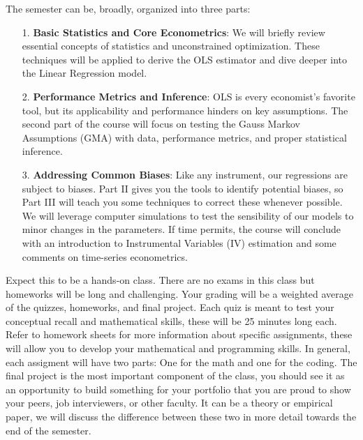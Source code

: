 \documentclass[10pt]{article}
\begin{document}
The semester can be, broadly, organized into three parts:

\begin{enumerate}
    \item [1.] \textbf{Basic Statistics and Core Econometrics}: We will briefly review essential concepts of statistics and unconstrained optimization. These techniques will be applied to derive the OLS estimator and dive deeper into the Linear Regression model.

    \item[2.] \textbf{Performance Metrics and Inference}: OLS is every economist's favorite tool, but its applicability and performance hinders on key assumptions. The second part of the course will focus on testing the Gauss Markov Assumptions (GMA) with data, performance metrics, and proper statistical inference.

    \item[3.] \textbf{Addressing Common Biases}: Like any instrument, our regressions are subject to biases. Part II gives you the tools to identify potential biases, so Part III will teach you some techniques to correct these whenever possible. We will leverage computer simulations to test the sensibility of our models to minor changes in the parameters. If time permits, the course will conclude with an introduction to Instrumental Variables (IV) estimation and some comments on time-series econometrics.
\end{enumerate}

Expect this to be a hands-on class. There are no exams in this class but homeworks will be long and challenging. Your grading will be a weighted average of the quizzes, homeworks, and final project. Each quiz is meant to test your conceptual recall and mathematical skills, these will be 25 minutes long each. Refer to homework sheets for more information about specific assignments, these will allow you to develop your mathematical and programming skills. In general, each assigment will have two parts: One for the math and one for the coding. The final project is the most important component of the class, you should see it as an opportunity to build something for your portfolio that you are proud to show your peers, job interviewers, or other faculty. It can be a theory or empirical paper, we will discuss the difference between these two in more detail towards the end of the semester.
\end{document}
